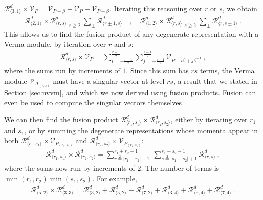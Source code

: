 \documentclass[12pt, a4paper]{article}
\begin{document}
$
 \mathcal{R}^d_{\langle 3,1\rangle} \times \mathcal{V}_P = \mathcal{V}_{P-\beta}+\mathcal{V}_P+\mathcal{V}_{P+\beta}
$. Iterating this reasoning over $r$ or $s$, we obtain 
\begin{align}
 \mathcal{R}^d_{\langle 2,1\rangle}\times \mathcal{R}^d_{\langle r,s\rangle} 
 \underset{r\geq 2}{=} \sum_\pm \mathcal{R}^d_{\langle r\pm 1,s\rangle} 
 \quad , \quad 
 \mathcal{R}^d_{\langle 1,2\rangle}\times \mathcal{R}^d_{\langle r,s\rangle} 
 \underset{s\geq 2}{=}\sum_\pm \mathcal{R}^d_{\langle r,s\pm 1\rangle} \ .
 \label{rrrs}
\end{align}
This allows us to find the fusion product of any degenerate representation with a Verma module, by iteration over $r$ and $s$:
\begin{align}
 \boxed{\mathcal{R}^d_{\langle r,s\rangle}\times \mathcal{V}_P = \sum_{i=-\frac{r-1}{2}}^{\frac{r-1}{2}} \sum_{j=-\frac{s-1}{2}}^{\frac{s-1}{2}} \mathcal{V}_{P+i\beta +j\beta^{-1}}}\ ,
 \label{rrsvp}
\end{align}
where the sums run by increments of $1$. Since this sum has $rs$ terms, the Verma module $\mathcal{V}_{\Delta_{(r,s)}}$ must have a singular vector at level $rs$, a result that we stated in Section \ref{sec:nvvm}, and which we now derived using fusion products. Fusion can even be used to compute the singular vectors themselves \cite{fms97}.

We can then find the fusion product $\mathcal{R}^d_{\langle r_1,s_1\rangle}\times \mathcal{R}^d_{\langle r_2,s_2\rangle}$, either by iterating over $r_1$ and $s_1$, or by summing the degenerate representations whose momenta appear in both  $\mathcal{R}^d_{\langle r_1,s_1\rangle}\times \mathcal{V}_{P_{(r_2,s_2)}}$ and $\mathcal{R}^d_{\langle r_2,s_2\rangle}\times \mathcal{V}_{P_{(r_1,s_1)}}$:
\begin{align}
  \boxed{\mathcal{R}^d_{\langle r_1,s_1 \rangle} \times \mathcal{R}^d_{\langle r_2,s_2 \rangle} = \sum_{r\overset{2}{=}|r_1-r_2|+1}^{r_1+r_2-1}\ \sum_{s\overset{2}{=}|s_1-s_2|+1}^{s_1+s_2-1} \mathcal{R}^d_{\langle r,s \rangle}}\ ,
  \label{rrsr}
\end{align}
where the sums now run by increments of $2$. The number of terms is $\min(r_1,r_2)\min(s_1,s_2)$. For example,
\begin{align}
 \mathcal{R}^d_{\langle 5,2\rangle}\times \mathcal{R}^d_{\langle 3,3\rangle} = \mathcal{R}^d_{\langle 3,2\rangle} + \mathcal{R}^d_{\langle 5, 2\rangle} + \mathcal{R}^d_{\langle 7,2\rangle} +\mathcal{R}^d_{\langle 3,4\rangle}+\mathcal{R}^d_{\langle 5,4\rangle} + \mathcal{R}^d_{\langle 7,4\rangle} \ .
\end{align}
\end{document}
